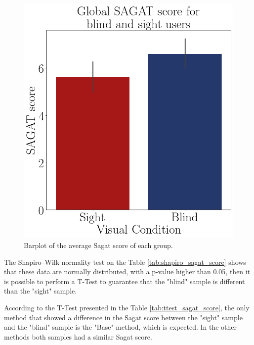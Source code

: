 \begin{figure}[!htb]
\begin{minipage}{.45\linewidth}
        \vspace{1.8cm}
        \centering
        \includegraphics[width = \linewidth]{Resultados/Sagat/Figuras/png/barplot_sagat_avg_global.png}
        \caption{Barplot of the average Sagat score of each group.}
        \label{fig:barplot_sagat}
    \end{minipage}
\end{figure}

The Shapiro–Wilk normality test on the Table \ref{tab:shapiro_sagat_score} shows that these data are normally distributed, with a p-value higher than 0.05, then it is possible to perform a T-Test to guarantee that the "blind" sample is different than the "sight" sample.

According to the T-Test presented in the Table \ref{tab:ttest_sagat_score}, the only method that showed a difference in the Sagat score between the "sight" sample and the "blind" sample is the "Base" method, which is expected. In the other methods both samples had a similar Sagat score.

